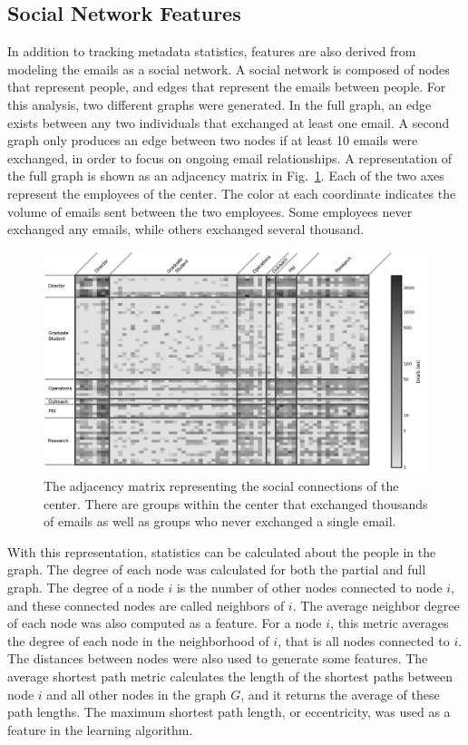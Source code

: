 \documentclass[10pt,twocolumn,conference]{IEEEtran}
\begin{document}
\subsection{Social Network Features}
In addition to tracking metadata statistics, features are also derived from modeling the emails as a social network.
A social network is composed of nodes that represent people, and edges that represent the emails between people.  For this analysis, two different graphs were generated.
In the full graph, an edge exists between any two individuals that exchanged at least one email.
A second graph only produces an edge between two nodes if at least 10 emails were exchanged, in order to focus on ongoing email relationships.
A representation of the full graph is shown as an adjacency matrix in Fig.~\ref{fig:adj_matrix}.
Each of the two axes represent the employees of the center.
The color at each coordinate indicates the volume of emails sent between the two employees.
Some employees never exchanged any emails, while others exchanged several thousand.

\begin{figure}[t]
    \centering
    \includegraphics[width=\columnwidth,trim={4mm 1mm 0mm 5mm},clip]{ViridisEdit_inv}
    \vspace{-17pt}
    \caption{The adjacency matrix representing the social connections of the center.  There are groups within the center that exchanged thousands of emails as well as groups who never exchanged a single email.}
    \vspace{-16pt}
    \label{fig:adj_matrix}
\end{figure}

With this representation, statistics can be calculated about the people in the graph.
The degree of each node was calculated for both the partial and full graph.
The degree of a node $i$ is the number of other nodes connected to node $i$, and these connected nodes are called neighbors of $i$.
The average neighbor degree of each node was also computed as a feature.
For a node $i$, this metric averages the degree of each node in the neighborhood of $i$, that is all nodes connected to $i$.
The distances between nodes were also used to generate some features.
The average shortest path metric calculates the length of the shortest paths between node $i$ and all other nodes in the graph $G$, and it returns the average of these path lengths.
The maximum shortest path length, or eccentricity, was used as a feature in the learning algorithm.  
\end{document}
